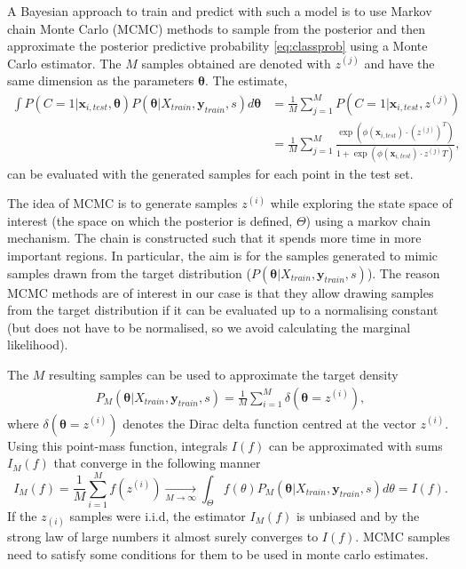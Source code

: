    
   
   A Bayesian approach to train and predict with such a model is to use Markov chain Monte Carlo (MCMC) methods to sample from the posterior and then approximate the posterior predictive probability \eqref{eq:classprob} using a Monte Carlo estimator. The $M$ samples obtained are denoted with $z^{(j)}$ and have the same dimension as the parameters $\bm{\theta}$. The estimate,
   \begin{align}
   	\int P(C=1|\mathbf{x}_{i,test},\bm{\theta}) P(\bm{\theta}|X_{train},\mathbf{y}_{train},s) d\bm{\theta} &= \frac{1}{M}\sum_{j=1}^M P(C=1|\mathbf{x}_{i,test},z^{(j)}) \\
   	&= \frac{1}{M}\sum_{j=1}^M  \frac{\exp(\phi(\mathbf{x}_{i,test}) \cdot(z^{(j)})^T)}{1+\exp(\phi( \mathbf{x}_{i,test}) \cdot z^{(j)}T)},
   \end{align} 
   can be evaluated with the generated samples for each point in the test set.
   
   
   The idea of MCMC is to generate samples $z^{(i)}$ while exploring the state space of interest (the space on which the posterior is defined, $\Theta$) using a markov chain mechanism. The chain is constructed such that it spends more time in more important regions. In particular, the aim is for the samples generated to mimic samples drawn from the target distribution ($P(\bm{\theta}|X_{train},\mathbf{y}_{train},s)$).
   The reason MCMC methods are of interest in our case is that they allow drawing samples from the target distribution if it can be evaluated up to a normalising constant (but does not have to be normalised, so we avoid calculating the marginal likelihood). 
   
   The $M$ resulting samples can be used to approximate the target density 
   \begin{align}
   	P_M(\bm{\theta}|X_{train},\mathbf{y}_{train},s) = \frac{1}{M}\sum_{i = 1}^M \delta(\bm{\theta} = z^{(i)}),
   \end{align}
   where $\delta(\bm{\theta} = z^{(i)})$ denotes the Dirac delta function centred at the vector $z^{(i)}$. Using this point-mass function, integrals $I(f)$ can be approximated with sums $I_M(f)$ that converge in the following manner
   \begin{equation}
   	I_M(f) = \frac{1}{M}\sum_{i = 1}^M f(z^{(i)})     \underset{M \rightarrow \infty}{{\rightarrow}} \int_{\Theta} f(\theta)P_M(\bm{\theta}|X_{train},\mathbf{y}_{train},s) d\theta = I(f).
   	\label{eq:convergencemcmc}
   \end{equation}
   If the $z_{(i)}$ samples were i.i.d, the estimator $I_M(f)$ is unbiased and by the strong law of large numbers it almost surely converges to $I(f)$. MCMC samples need to satisfy some conditions for them to be used in monte carlo estimates.
   
